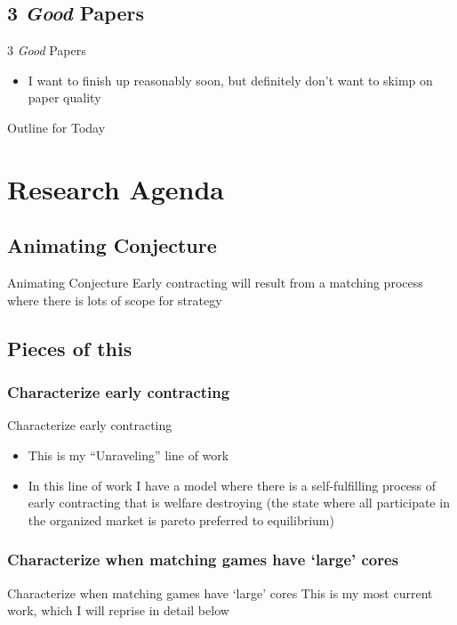 \documentclass{beamer}
\begin{document}
\subsection{3 \emph{Good} Papers}

\begin{frame}{3 \emph{Good} Papers}
	\begin{itemize}
		\item I want to finish up reasonably soon, but definitely don't want to skimp on paper quality
	\end{itemize}
\end{frame}

\begin{frame}{Outline for Today}
	\tableofcontents
\end{frame}

\section{Research Agenda}
\subsection{Animating Conjecture}
\begin{frame}{Animating Conjecture}
	Early contracting will result from a matching process where there is lots of scope for strategy 
\end{frame}

\subsection{Pieces of this}
\subsubsection{Characterize early contracting}
\begin{frame}{Characterize early contracting}
	\begin{itemize}
		\item This is my ``Unraveling'' line of work
		\item In this line of work I have a model where there is a self-fulfilling process of early contracting that is welfare destroying (the state where all participate in the organized market is pareto preferred to equilibrium) 
	\end{itemize}
\end{frame}

\subsubsection{Characterize when matching games have `large' cores}
\begin{frame}{Characterize when matching games have `large' cores}
	This is my  most current work, which I will reprise in detail below
\end{frame}
\end{document}
